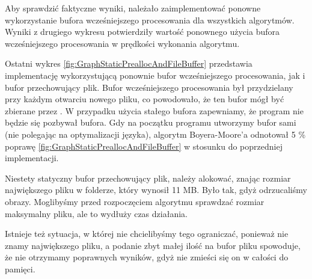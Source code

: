 Aby sprawdzić faktyczne wyniki, należało zaimplementować ponowne wykorzystanie
bufora wcześniejszego procesowania dla wszystkich algorytmów. Wyniki z drugiego wykresu 
potwierdziły wartość ponownego użycia bufora wcześniejszego procesowania w prędkości wykonania
algorytmu.

Ostatni wykres \ref{fig:GraphStaticPreallocAndFileBuffer} przedstawia implementację wykorzystującą ponownie bufor wcześniejszego
procesowania, jak i bufor przechowujący plik.
Bufor wcześniejszego procesowania był przydzielany przy każdym otwarciu nowego pliku,
co powodowało, że ten bufor mógł być zbierane przez .
W przypadku użycia stałego bufora zapewniamy, że program nie będzie się pozbywał
bufora. Gdy na początku programu utworzymy bufor sami (nie polegając na optymalizacji języka),
algorytm Boyera-Moore'a odnotował 5 \% poprawę \ref{fig:GraphStaticPreallocAndFileBuffer}
w stosunku do poprzedniej implementacji.

Niestety statyczny bufor przechowujący plik, należy alokować, znając rozmiar 
największego pliku w folderze, który wynosił 11 MB. Było tak, gdyż odrzucaliśmy
obrazy. Moglibyśmy przed rozpoczęciem algorytmu sprawdzać rozmiar maksymalny 
pliku, ale to wydłuży czas działania. 

Istnieje też sytuacja, w której nie chcielibyśmy tego ograniczać, ponieważ nie
znamy największego pliku, a podanie zbyt małej ilość na bufor pliku spowoduje,
że nie otrzymamy poprawnych wyników, gdyż nie zmieści się on w całości do 
pamięci.

